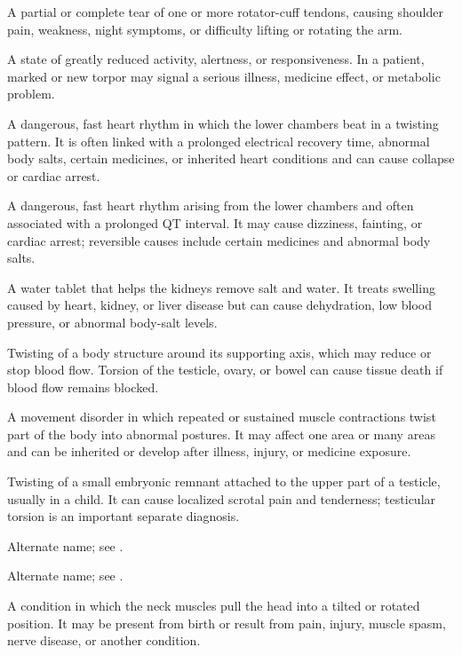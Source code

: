  A partial or complete tear of one or more rotator-cuff tendons, causing shoulder pain, weakness, night symptoms, or difficulty lifting or rotating the arm.

 A state of greatly reduced activity, alertness, or responsiveness. In a patient, marked or new torpor may signal a serious illness, medicine effect, or metabolic problem.

 A dangerous, fast heart rhythm in which the lower chambers beat in a twisting pattern. It is often linked with a prolonged electrical recovery time, abnormal body salts, certain medicines, or inherited heart conditions and can cause collapse or cardiac arrest.

 A dangerous, fast heart rhythm arising from the lower chambers and often associated with a prolonged QT interval. It may cause dizziness, fainting, or cardiac arrest; reversible causes include certain medicines and abnormal body salts.

 A water tablet that helps the kidneys remove salt and water. It treats swelling caused by heart, kidney, or liver disease but can cause dehydration, low blood pressure, or abnormal body-salt levels.

 Twisting of a body structure around its supporting axis, which may reduce or stop blood flow. Torsion of the testicle, ovary, or bowel can cause tissue death if blood flow remains blocked.

 A movement disorder in which repeated or sustained muscle contractions twist part of the body into abnormal postures. It may affect one area or many areas and can be inherited or develop after illness, injury, or medicine exposure.

 Twisting of a small embryonic remnant attached to the upper part of a testicle, usually in a child. It can cause localized scrotal pain and tenderness; testicular torsion is an important separate diagnosis.

 Alternate name; see .

 Alternate name; see .

 A condition in which the neck muscles pull the head into a tilted or rotated position. It may be present from birth or result from pain, injury, muscle spasm, nerve disease, or another condition.

